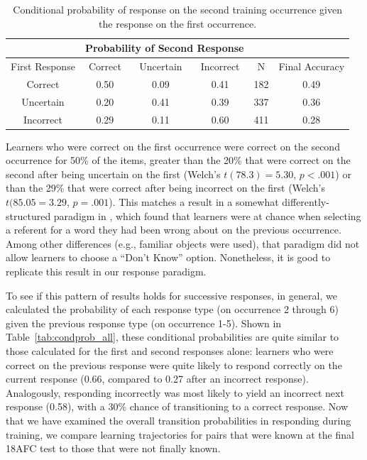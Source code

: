 \documentclass[man,floatsintext]{apa6}
\begin{document}
\begin{table}[ht] 
\begin{center}
\caption{Conditional probability of response on the second training occurrence given the response on the first occurrence.} 
\label{tab:condprob} 
\vskip 0.05in
\begin{tabular}{c | c c c | c | c}
&  \multicolumn{3}{|c|}{Probability of Second Response} & & \\
 \hline
First Response   &  Correct & Uncertain & Incorrect & N & Final Accuracy \\
\hline 
Correct	 &   0.50  &   0.09   &   0.41 &  182    &     0.49     \\
Uncertain  &   0.20  &   0.41   &    0.39 &  337    &     0.36     \\
Incorrect 	 &   0.29  &   0.11   &    0.60 &  411    &      0.28    \\
\hline
\end{tabular} 
\end{center}
\end{table}

Learners who were correct on the first occurrence were correct on the second occurrence for 50\% of the items, greater than the 20\% that were correct on the second after being uncertain on the first (Welch's $t(78.3)=5.30$, $p<.001$) or than the 29\% that were correct after being incorrect on the first (Welch's $t(85.05=3.29$, $p=.001$). This matches a result in a somewhat differently-structured paradigm in \cite{Trueswell:2013}, which found that learners were at chance when selecting a referent for a word they had been wrong about on the previous occurrence. Among other differences (e.g., familiar objects were used), that paradigm did not allow learners to choose a ``Don't Know'' option. Nonetheless, it is good to replicate this result in our response paradigm.


To see if this pattern of results holds for successive responses, in general, we calculated the probability of each response type (on occurrence 2 through 6) given the previous response type (on occurrence 1-5). Shown in Table~\ref{tab:condprob_all}, these conditional probabilities are quite similar to those calculated for the first and second responses alone: learners who were correct on the previous response were quite likely to respond correctly on the current response (0.66, compared to 0.27 after an incorrect response). Analogously, responding incorrectly was most likely to yield an incorrect next response (0.58), with a 30\% chance of transitioning to a correct response. Now that we have examined the overall transition probabilities in responding during training, we compare learning trajectories for pairs that were known at the final 18AFC test to those that were not finally known.
\end{document}
